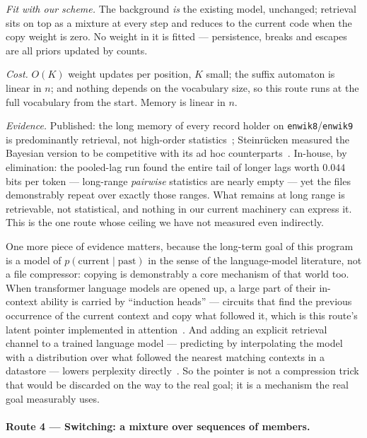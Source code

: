 \documentclass[11pt]{article}
\begin{document}
\emph{Fit with our scheme.}  The background \emph{is} the existing
model, unchanged; retrieval sits on top as a mixture at every step
and reduces to the current code when the copy weight is zero.  No
weight in it is fitted --- persistence, breaks and escapes are all
priors updated by counts.

\emph{Cost.}  $O(K)$ weight updates per position, $K$ small; the
suffix automaton is linear in $n$; and nothing depends on the
vocabulary size, so this route runs at the full vocabulary from the
start.  Memory is linear in $n$.

\emph{Evidence.}  Published: the long memory of every record holder
on \texttt{enwik8}/\texttt{enwik9} is predominantly retrieval, not
high-order statistics~\cite{paq}; Steinr\"ucken measured the Bayesian
version to be competitive with its ad hoc
counterparts~\cite{steinruecken}.  In-house, by elimination: the
pooled-lag run found the entire tail of longer lags worth $0.044$
bits per token --- long-range \emph{pairwise} statistics are nearly
empty --- yet the files demonstrably repeat over exactly those
ranges.  What remains at long range is retrievable, not statistical,
and nothing in our current machinery can express it.  This is the one
route whose ceiling we have not measured even indirectly.

One more piece of evidence matters, because the long-term goal of
this program is a model of $p(\text{current} \mid \text{past})$ in
the sense of the language-model literature, not a file compressor:
copying is demonstrably a core mechanism of that world too.  When
transformer language models are opened up, a large part of their
in-context ability is carried by ``induction heads'' --- circuits
that find the previous occurrence of the current context and copy
what followed it, which is this route's latent pointer implemented in
attention~\cite{inductionheads}.  And adding an explicit retrieval
channel to a trained language model --- predicting by interpolating
the model with a distribution over what followed the nearest matching
contexts in a datastore --- lowers perplexity
directly~\cite{knnlm}.  So the pointer is not a compression trick
that would be discarded on the way to the real goal; it is a
mechanism the real goal measurably uses.

\paragraph{Route 4 --- Switching: a mixture over sequences of members.}
\end{document}
